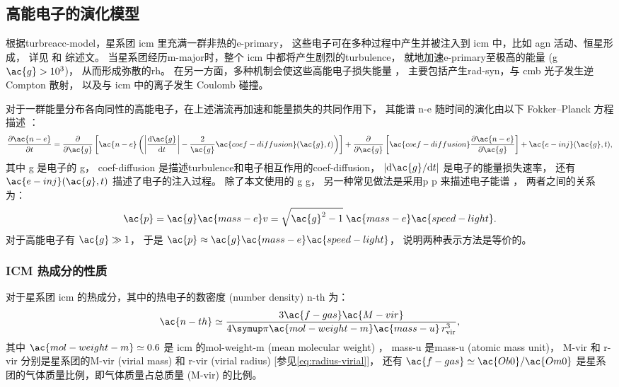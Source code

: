 \subsection{高能电子的演化模型}
\label{sec:halo-evo}

根据\ac{turbreacc-model}，星系团 \ac{icm} 里充满一群非热的\ac{e-primary}，
这些电子可在多种过程中产生并被注入到 \ac{icm} 中，比如 \ac{agn} 活动、恒星形成，
详见  和  综述文。
当星系团经历\ac{m-major}时，整个 \ac{icm} 中都将产生剧烈的\ac{turbulence}，
就地加速\ac{e-primary}至极高的能量 (\acl{g} $\ac{g} > \num{e3}$)，
从而形成弥散的\ac{rh}。
在另一方面，多种机制会使这些高能电子损失能量 \cite{sarazin1999}，
主要包括产生\ac{rad-syn}，与 \ac{cmb} 光子发生逆 Compton 散射，
以及与 \ac{icm} 中的离子发生 Coulomb 碰撞。

对于一群能量分布各向同性的高能电子，在上述湍流再加速和能量损失的共同作用下，
其能谱 \ac{n-e} 随时间的演化由以下 Fokker--Planck 方程描述
\cite{eilek1991,schlickeiser2002}：
\begin{equation}
  \label{eq:fokkerplanck}
  \pdiff{\ac{n-e}}{t} =
    \pdiff{}{\ac{g}} \left[ \ac{n-e} \left(
      \left| \diff{\ac{g}}{t} \right| -
      \frac{2}{\ac{g}} \ac{coef-diffusion}(\ac{g}, t) \right) \right]
    + \pdiff{}{\ac{g}} \left[
      \ac{coef-diffusion} \pdiff{\ac{n-e}}{\ac{g}} \right]
    + \ac{e-inj}(\ac{g}, t) ,
\end{equation}
其中
\ac{g} 是电子的 \acl{g}，
\ac{coef-diffusion} 是描述\ac{turbulence}和电子相互作用的\acl{coef-diffusion}，
$|\R{d}\ac{g} / \R{d}t|$ 是电子的能量损失速率，
还有 $\ac{e-inj}(\ac{g}, t)$ 描述了电子的注入过程。
除了本文使用的 \acl{g} \ac{g}，
另一种常见做法是采用\acl{p} \ac{p} 来描述电子能谱 \cite{cassano2005,donnert2014}，
两者之间的关系为：
\begin{equation}
  \ac{p} = \ac{g} \ac{mass-e} v
    = \sqrt{\ac{g}^2 - 1} \; \ac{mass-e} \ac{speed-light} .
\end{equation}
对于高能电子有 $\ac{g} \gg 1$，
于是 $\ac{p} \approx \ac{g} \ac{mass-e} \ac{speed-light}$，
说明两种表示方法是等价的。

\subsubsection{ICM 热成分的性质}

对于星系团 \ac{icm} 的热成分，其中的热电子的数密度 (number density) \ac{n-th} 为：
\begin{equation}
  \label{eq:n-th}
  \ac{n-th} \simeq
    \frac{3 \ac{f-gas} \ac{M-vir}}{
      4\Cpi \ac{mol-weight-m} \ac{mass-u} \,r^3_{\R{vir}}} ,
\end{equation}
其中
$\ac{mol-weight-m} \simeq 0.6$ 是 \ac{icm} 的\acl{mol-weight-m}
(mean molecular weight) \cite{ettori2013}，
\ac{mass-u} 是\acl{mass-u} (atomic mass unit)，
\ac{M-vir} 和 \ac{r-vir} 分别是星系团的\acl{M-vir} (virial mass) 和
\acl{r-vir} (virial radius) [参见\autoref{eq:radius-virial}]，
还有 $\ac{f-gas} \simeq \ac{Ob0}/\ac{Om0}$
是星系团的气体质量比例，即气体质量占总质量 (\ac{M-vir}) 的比例。


